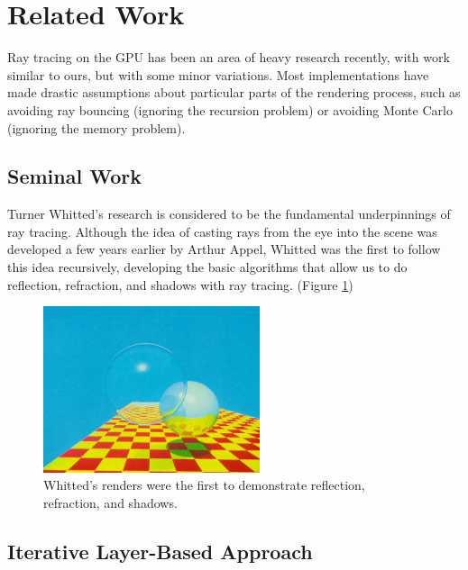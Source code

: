 \documentclass{acmsiggraph}                     %
\begin{document}
\section{Related Work}
\label{sec:related}

Ray tracing on the GPU has been an area of heavy research recently, with work similar to ours, but with
some minor variations. Most implementations have made drastic assumptions about particular parts of the
rendering process, such as avoiding ray bouncing (ignoring the recursion problem) or avoiding Monte Carlo
(ignoring the memory problem).

    \subsection{Seminal Work}
    \label{sec:seminal}

    Turner Whitted's research \cite{Whitted80} is considered to be the fundamental underpinnings of
    ray tracing. Although the idea of casting rays from the eye into the scene was developed a few
    years earlier by Arthur Appel, Whitted was the first to follow this idea recursively, developing
    the basic algorithms that allow us to do reflection, refraction, and shadows with ray tracing.
    (Figure \ref{fig:whitted})

    \begin{figure}[htb]
        \begin{center}
            \leavevmode
            \includegraphics[width=2.5in]{whitted.jpg}
        \end{center}
        \caption{Whitted's renders were the first to demonstrate reflection, refraction, and shadows.}
        \label{fig:whitted}
    \end{figure}

    \subsection{Iterative Layer-Based Approach}
    \label{sec:layerbased}
\end{document}
